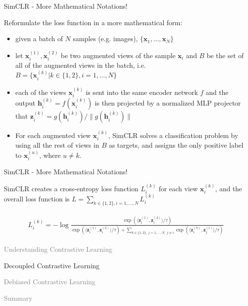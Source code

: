 \documentclass[aspectratio=169,mathserif]{beamer}  %
\newcommand{\light}[1]{\textcolor{gray}{#1}}
\begin{document}
\begin{frame}{SimCLR - More Mathematical Notations!}

Reformulate the loss function in a more mathematical form:

\pause

\begin{itemize}[<+->]
    \item given a batch of $N$ samples (e.g. images), $\{\bm{x}_1,\ldots,\bm{x}_N\}$
    \item let $\bm{x}_i^{(1)},\bm{x}_i^{(2)}$ be two augmented views of the sample $\bm{x}_i$ and $B$ be the set of all of the augmented views in the batch, i.e. $B=\{\bm{x}_i^{(k)}|k\in\{1,2\},i=1,\ldots,N\}$
    \item each of the views $\bm{x}_i^{(k)}$ is sent into the same encoder network $f$ and the output $\bm{h}_i^{(k)}=f(\bm{x}_i^{(k)})$ is then projected by a normalized MLP projector that $\bm{z}_i^{(k)}=g(\bm{h}_i^{(k)})/\|g(\bm{h}_i^{(k)})\|$
    \item For each augmented view $\bm{x}_i^{(k)}$, SimCLR solves a classification problem by using all the rest of views in $B$ as targets, and assigns the only positive label to $\bm{x}_i^{(u)}$, where $u\neq k$.
\end{itemize}


\end{frame}



\begin{frame}{SimCLR - More Mathematical Notations!}

SimCLR creates a cross-entropy loss function $L_i^{(k)}$ for each view $\bm{x}_i^{(k)}$, and the overall loss function is $L=\sum_{k\in \{1,2\}, i=1,\ldots,N} L_i^{(k)}$

\begin{eqnarray}
\begin{aligned}
L_i^{(k)}=-\log \frac{\exp (\langle \bm{z}_i^{(1)}, \bm{z}_i^{(2)} \rangle / \tau)}{\exp (\langle \bm{z}_i^{(1)}, \bm{z}_i^{(2)} \rangle / \tau) +\sum_{k\in \{1,2\},\ j=1,\ldots,N,\ j\neq i} \exp (\langle \bm{z}_i^{(k)}, \bm{z}_j^{(l)} \rangle / \tau)}
\end{aligned}
\end{eqnarray}


\end{frame}



\begin{frame}[noframenumbering]
\begin{itemize}
    \begin{LARGE}
    \item \light{Understanding Contrastive Learning}
    \item Decoupled Contrastive Learning
    \item \light{Debiased Contrastive Learning}
    \item \light{Summary}
    \end{LARGE}
\end{itemize}
\end{frame}
\end{document}
